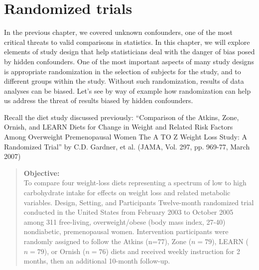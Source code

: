 \documentclass[11pt, chapterprefix=true]{scrbook}\usepackage[]{graphicx}\usepackage[]{color}
\begin{document}

\section{Randomized trials}

In the previous chapter, we covered unknown confounders, one of the most critical threats to valid comparisons in statistics. In this chapter, we will explore elements of study design that help statisticians deal with the danger of bias posed by hidden confounders. One of the most important aspects of many study designs is appropriate randomization in the selection of subjects for the study, and to different groups within the study. Without such randomization, results of data analyses can be biased. Let's see by way of example how randomization can help us address the threat of results biased by hidden confounders.

Recall the diet study discussed previously: ``Comparison of the Atkins, Zone, Ornish, and LEARN Diets for Change in Weight and Related Risk Factors Among Overweight Premenopausal Women The A TO Z Weight Loss Study: A Randomized Trial'' by C.D. Gardner, et al. (JAMA, Vol. 297, pp. 969-77, March 2007)

\begin{quotation}
 \textbf{Objective:} \\ To compare four weight-loss diets representing a spectrum of low to high carbohydrate intake for effects on weight loss and related metabolic variables. Design, Setting, and Participants Twelve-month randomized trial conducted in the United States from February 2003 to October 2005 among 311 free-living, overweight/obese (body mass index, 27-40) nondiabetic, premenopausal women.  Intervention participants were randomly assigned to follow the Atkins (n=77), Zone ($n = 79$), LEARN ($n = 79$), or Ornish ($n = 76$) diets and received weekly instruction for 2 months, then an additional 10-month follow-up.
\end{quotation}
\end{document}
